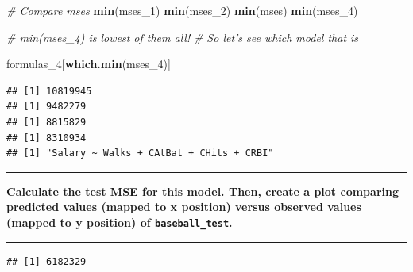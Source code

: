 \documentclass[12pt,]{article}
\newenvironment{Shaded}{\begin{snugshade}}{\end{snugshade}}
\newcommand{\CommentTok}[1]{\textcolor[rgb]{0.56,0.35,0.01}{\textit{#1}}}
\newcommand{\DataTypeTok}[1]{\textcolor[rgb]{0.13,0.29,0.53}{#1}}
\newcommand{\DecValTok}[1]{\textcolor[rgb]{0.00,0.00,0.81}{#1}}
\newcommand{\KeywordTok}[1]{\textcolor[rgb]{0.13,0.29,0.53}{\textbf{#1}}}
\newcommand{\NormalTok}[1]{#1}
\newcommand{\OperatorTok}[1]{\textcolor[rgb]{0.81,0.36,0.00}{\textbf{#1}}}
\newcommand{\StringTok}[1]{\textcolor[rgb]{0.31,0.60,0.02}{#1}}
\begin{document}
\begin{Shaded}
\begin{Highlighting}[]
\CommentTok{# Compare mses}
\KeywordTok{min}\NormalTok{(mses_}\DecValTok{1}\NormalTok{)}
\KeywordTok{min}\NormalTok{(mses_}\DecValTok{2}\NormalTok{)}
\KeywordTok{min}\NormalTok{(mses)}
\KeywordTok{min}\NormalTok{(mses_}\DecValTok{4}\NormalTok{)}

\CommentTok{# min(mses_4) is lowest of them all!}
\CommentTok{# So let's see which model that is}

\NormalTok{formulas_}\DecValTok{4}\NormalTok{[}\KeywordTok{which.min}\NormalTok{(mses_}\DecValTok{4}\NormalTok{)]}
\end{Highlighting}
\end{Shaded}

\begin{verbatim}
## [1] 10819945
## [1] 9482279
## [1] 8815829
## [1] 8310934
## [1] "Salary ~ Walks + CAtBat + CHits + CRBI"
\end{verbatim}

\begin{center}\rule{0.5\linewidth}{\linethickness}\end{center}

\textbf{Calculate the test MSE for this model. Then, create a plot
comparing predicted values (mapped to x position) versus observed values
(mapped to y position) of \texttt{baseball\_test}.}

\begin{center}\rule{0.5\linewidth}{\linethickness}\end{center}

\begin{Shaded}
\end{Shaded}

\begin{verbatim}
## [1] 6182329
\end{verbatim}
\end{document}
